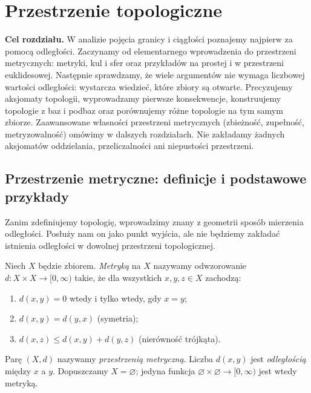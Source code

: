 \chapter{Przestrzenie topologiczne}
\label{ch:topog-przestrzenie-topologiczne}

\noindent\textbf{Cel rozdziału.}
W analizie pojęcia granicy i ciągłości poznajemy najpierw za pomocą odległości.
Zaczynamy od elementarnego wprowadzenia do przestrzeni metrycznych:
metryki, kul i sfer oraz przykładów na prostej i w przestrzeni euklidesowej.
Następnie sprawdzamy, że wiele argumentów nie wymaga liczbowej
wartości odległości: wystarcza wiedzieć, które zbiory są otwarte.
Precyzujemy aksjomaty topologii, wyprowadzamy pierwsze konsekwencje,
konstruujemy topologie z baz i podbaz oraz porównujemy różne topologie
na tym samym zbiorze. Zaawansowane własności przestrzeni metrycznych
(zbieżność, zupełność, metryzowalność) omówimy w dalszych rozdziałach.
Nie zakładamy żadnych aksjomatów oddzielania, przeliczalności
ani niepustości przestrzeni.

\section{Przestrzenie metryczne: definicje i podstawowe przykłady}
\label{sec:topog-motywacja}

Zanim zdefiniujemy topologię, wprowadzimy znany z geometrii
sposób mierzenia odległości. Posłuży nam on jako punkt wyjścia,
ale nie będziemy zakładać istnienia odległości w dowolnej
przestrzeni topologicznej.

\begin{definicja}
\label{def:topog-metryka}
Niech $X$ będzie zbiorem. \emph{Metryką} na $X$ nazywamy
odwzorowanie $d\colon X\times X\to[0,\infty)$ takie, że
dla wszystkich $x,y,z\in X$ zachodzą:
\begin{enumerate}[label=(M\arabic*)]
\item $d(x,y)=0$ wtedy i tylko wtedy, gdy $x=y$;
\item $d(x,y)=d(y,x)$ (symetria);
\item $d(x,z)\le d(x,y)+d(y,z)$ (nierówność trójkąta).
\end{enumerate}
Parę $(X,d)$ nazywamy \emph{przestrzenią metryczną}.
Liczba $d(x,y)$ jest \emph{odległością} między $x$ a $y$.
Dopuszczamy $X=\varnothing$; jedyna funkcja
$\varnothing\times\varnothing\to[0,\infty)$ jest wtedy metryką.
\end{definicja}

